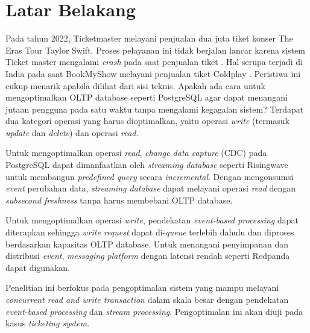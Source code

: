 \section{Latar Belakang}
\label{sec:latar-belakang}

Pada tahun 2022, Ticketmaster melayani penjualan dua juta tiket konser The Eras Tour Taylor Swift. Proses pelayanan ini tidak berjalan lancar karena sistem Ticket master mengalami \textit{crash} pada saat penjualan tiket \parencite{swiftTicketmaster}. Hal serupa terjadi di India pada saat BookMyShow melayani penjualan tiket Coldplay \parencite{coldplayBookMyShow}. Peristiwa ini cukup menarik apabila dilihat dari sisi teknis. Apakah ada cara untuk mengoptimalkan OLTP database seperti PostgreSQL agar dapat menangani jutaan pengguna pada satu waktu tanpa mengalami kegagalan sistem? Terdapat dua kategori operasi yang harus dioptimalkan, yaitu operasi \textit{write} (termasuk \textit{update} dan \textit{delete}) dan operasi \textit{read}.

Untuk mengoptimalkan operasi \textit{read}, \textit{change data capture} (CDC) pada PostgreSQL dapat dimanfaatkan oleh \textit{streaming database} seperti Risingwave untuk membangun \textit{predefined query} secara \textit{incremental}. Dengan mengonsumsi \textit{event} perubahan data, \textit{streaming database} dapat melayani operasi \textit{read} dengan \textit{subsecond freshness} tanpa harus membebani OLTP database.

Untuk mengoptimalkan operasi \textit{write}, pendekatan \textit{event-based processing} dapat diterapkan sehingga \textit{write request} dapat di-\textit{queue} terlebih dahulu dan diproses berdasarkan kapasitas OLTP database. Untuk menangani penyimpanan dan distribusi \textit{event}, \textit{messaging platform} dengan latensi rendah seperti Redpanda dapat digunakan.

Penelitian ini berfokus pada pengoptimalan sistem yang mampu melayani \textit{concurrent read and write transaction} dalam skala besar dengan pendekatan \textit{event-based processing} dan \textit{stream processing}. Pengoptimalan ini akan diuji pada kasus \textit{ticketing system}.

